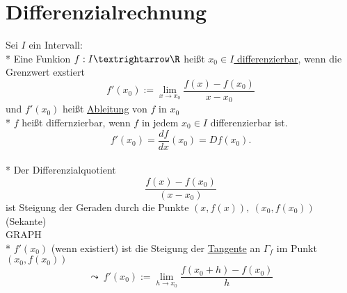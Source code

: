 %
\chapter*{Differenzialrechnung}
Sei $I$ ein Intervall:\\*
Eine Funkion $f:I→\R $ heißt \ul{$x_0\in I$ differenzierbar}, wenn die Grenzwert exstiert $$f'(x_0):=\lim_{x→x_0}\frac{f(x)-f(x_0)}{x-x_0}$$ und $f'(x_0)$ heißt \ul{Ableitung} von $f$ in $x_0$\\*
$f$ heißt differnzierbar, wenn $f$ in jedem $x_0\in I$ differenzierbar ist.
$$f'(x_0)=\frac{df}{dx}(x_0)=Df(x_0).$$\\*
Der Differenzialquotient $$ \frac{f(x)-f(x_0)}{(x-x_0)} $$ ist Steigung der Geraden durch die Punkte $ (x,f(x)),\ (x_0,f(x_0)) $ (Sekante)\\
GRAPH\\*
$f'(x_0)$ (wenn existiert) ist die Steigung der \ul{Tangente} an $Γ_f$ im Punkt $(x_0,f(x_0))$
\bem
{}
$$\leadsto\ f'(x_0):=\lim_{h→x_0}\frac{f(x_0+h)-f(x_0)}{h}$$
\bsp
